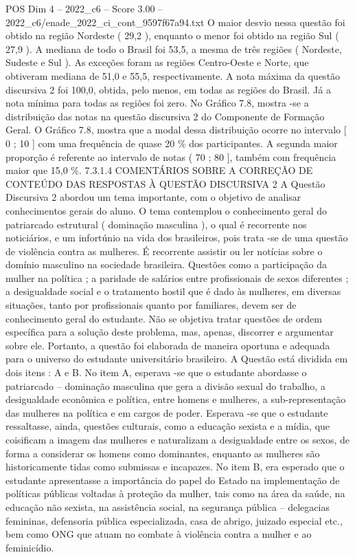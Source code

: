 \begin{textsample}{POS Dim 4 – 2022\_c6 – Score 3.00 – 2022\_c6/enade\_2022\_ci\_cont\_9597f67a94.txt}
O maior desvio nessa questão foi obtido na região Nordeste ( 29,2 ), enquanto o menor foi obtido na região Sul ( 27,9 ).
A mediana de todo o Brasil foi 53,5, a mesma de três regiões ( Nordeste, Sudeste e Sul ).
As exceções foram as regiões Centro-Oeste e Norte, que obtiveram mediana de 51,0 e 55,5, respectivamente.
A nota máxima da questão discursiva 2 foi 100,0, obtida, pelo menos, em todas as regiões do Brasil.
Já a nota mínima para todas as regiões foi zero.
No Gráfico 7.8, mostra -se a distribuição das notas na questão discursiva 2 do Componente de Formação Geral.
O Gráfico 7.8, mostra que a modal dessa distribuição ocorre no intervalo [ 0 ; 10 ] com uma frequência de quase 20 \% dos participantes.
A segunda maior proporção é referente ao intervalo de notas ( 70 ; 80 ], também com frequência maior que 15,0 \%. 7.3.1.4 COMENTÁRIOS SOBRE A CORREÇÃO DE CONTEÚDO DAS RESPOSTAS À QUESTÃO DISCURSIVA 2 A Questão Discursiva 2 abordou um tema importante, com o objetivo de analisar conhecimentos gerais do aluno.
O tema contemplou o conhecimento geral do patriarcado estrutural ( dominação masculina ), o qual é recorrente nos noticiários, e um infortúnio na vida dos brasileiros, pois trata -se de uma questão de violência contra as mulheres.
É recorrente assistir ou ler notícias sobre o domínio masculino na sociedade brasileira.
Questões como a participação da mulher na política ; a paridade de salários entre profissionais de sexos diferentes ; a desigualdade social e o tratamento hostil que é dado às mulheres, em diversas situações, tanto por profissionais quanto por familiares, devem ser de conhecimento geral do estudante.
Não se objetiva tratar questões de ordem específica para a solução deste problema, mas, apenas, discorrer e argumentar sobre ele.
Portanto, a questão foi elaborada de maneira oportuna e adequada para o universo do estudante universitário brasileiro.
A Questão está dividida em dois itens : A e B.
No item A, esperava -se que o estudante abordasse o patriarcado – dominação masculina que gera a divisão sexual do trabalho, a desigualdade econômica e política, entre homens e mulheres, a sub-representação das mulheres na política e em cargos de poder.
Esperava -se que o estudante ressaltasse, ainda, questões culturais, como a educação sexista e a mídia, que coisificam a imagem das mulheres e naturalizam a desigualdade entre os sexos, de forma a considerar os homens como dominantes, enquanto as mulheres são historicamente tidas como submissas e incapazes.
No item B, era esperado que o estudante apresentasse a importância do papel do Estado na implementação de políticas públicas voltadas à proteção da mulher, tais como na área da saúde, na educação não sexista, na assistência social, na segurança pública – delegacias femininas, defensoria pública especializada, casa de abrigo, juizado especial etc., bem como ONG que atuam no combate à violência contra a mulher e ao feminicídio.

\end{textsample}
